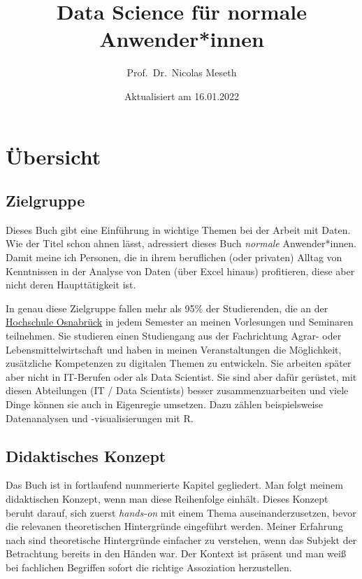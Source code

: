 \documentclass[
]{book}
\title{Data Science für normale Anwender*innen}
\author{Prof.~Dr.~Nicolas Meseth}
\date{Aktualisiert am 16.01.2022}
\begin{document}
\maketitle

{
\setcounter{tocdepth}{1}
\tableofcontents
}
\hypertarget{uxfcbersicht}{%
\chapter*{Übersicht}\label{uxfcbersicht}}

\hypertarget{zielgruppe}{%
\section*{Zielgruppe}\label{zielgruppe}}

Dieses Buch gibt eine Einführung in wichtige Themen bei der Arbeit mit Daten. Wie der Titel schon ahnen lässt, adressiert dieses Buch \emph{normale} Anwender*innen. Damit meine ich Personen, die in ihrem beruflichen (oder privaten) Alltag von Kenntnissen in der Analyse von Daten (über Excel hinaus) profitieren, diese aber nicht deren Haupttätigkeit ist.

In genau diese Zielgruppe fallen mehr als 95\% der Studierenden, die an der \href{https://hs-osnabrueck.de}{Hochschule Osnabrück} in jedem Semester an meinen Vorlesungen und Seminaren teilnehmen. Sie studieren einen Studiengang aus der Fachrichtung Agrar- oder Lebensmittelwirtschaft und haben in meinen Veranstaltungen die Möglichkeit, zusätzliche Kompetenzen zu digitalen Themen zu entwickeln. Sie arbeiten später aber nicht in IT-Berufen oder als Data Scientist. Sie sind aber dafür gerüstet, mit diesen Abteilungen (IT / Data Scientists) besser zusammenzuarbeiten und viele Dinge können sie auch in Eigenregie umsetzen. Dazu zählen beispielsweise Datenanalysen und -visualisierungen mit R.

\hypertarget{didaktisches-konzept}{%
\section*{Didaktisches Konzept}\label{didaktisches-konzept}}

Das Buch ist in fortlaufend nummerierte Kapitel gegliedert. Man folgt meinem didaktischen Konzept, wenn man diese Reihenfolge einhält. Dieses Konzept beruht darauf, sich zuerst \emph{hands-on} mit einem Thema auseinanderzusetzen, bevor die relevanen theoretischen Hintergründe eingeführt werden. Meiner Erfahrung nach sind theoretische Hintergründe einfacher zu verstehen, wenn das Subjekt der Betrachtung bereits in den Händen war. Der Kontext ist präsent und man weiß bei fachlichen Begriffen sofort die richtige Assoziation herzustellen.
\end{document}
